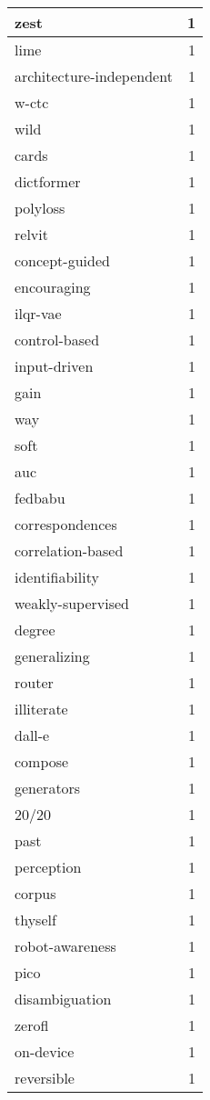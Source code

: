\begin{table}[h]
\begin{tabular}{|l|r|}
\hline
zest & 1 \\
\hline
lime & 1 \\
\hline
architecture-independent & 1 \\
\hline
w-ctc & 1 \\
\hline
wild & 1 \\
\hline
cards & 1 \\
\hline
dictformer & 1 \\
\hline
polyloss & 1 \\
\hline
relvit & 1 \\
\hline
concept-guided & 1 \\
\hline
encouraging & 1 \\
\hline
ilqr-vae & 1 \\
\hline
control-based & 1 \\
\hline
input-driven & 1 \\
\hline
gain & 1 \\
\hline
way & 1 \\
\hline
soft & 1 \\
\hline
auc & 1 \\
\hline
fedbabu & 1 \\
\hline
correspondences & 1 \\
\hline
correlation-based & 1 \\
\hline
identifiability & 1 \\
\hline
weakly-supervised & 1 \\
\hline
degree & 1 \\
\hline
generalizing & 1 \\
\hline
router & 1 \\
\hline
illiterate & 1 \\
\hline
dall-e & 1 \\
\hline
compose & 1 \\
\hline
generators & 1 \\
\hline
20/20 & 1 \\
\hline
past & 1 \\
\hline
perception & 1 \\
\hline
corpus & 1 \\
\hline
thyself & 1 \\
\hline
robot-awareness & 1 \\
\hline
pico & 1 \\
\hline
disambiguation & 1 \\
\hline
zerofl & 1 \\
\hline
on-device & 1 \\
\hline
reversible & 1 \\

\end{tabular}
\end{table}
